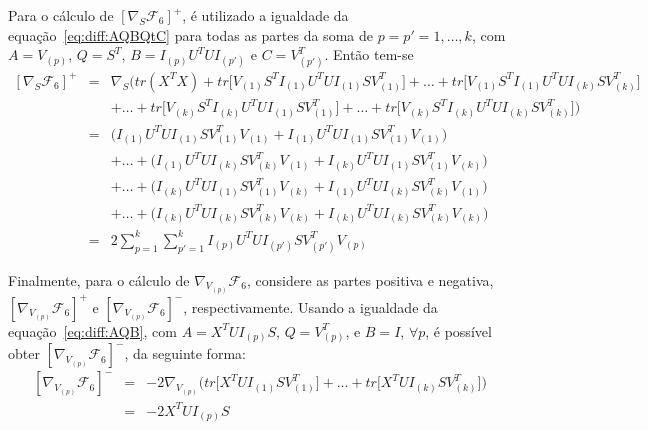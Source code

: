 \documentclass[
    12pt,                %
    oneside,            %
    a4paper,            %
    english,            %
    brazil                %
    ]{abntex2ppgsi}
\begin{document}
Para o cálculo de $[\nabla_S \mathcal{F}_6]^+$, é utilizado a igualdade da equação~\ref{eq:diff:AQBQtC} para todas as partes da soma de $p = p' = 1, \dots, k$, com $A = V_{(p)}$, $Q = S^T$, $B = I_{(p)} U^T U I_{(p')}$ e $C = V_{(p')}^T$. Então tem-se
\[
    \begin{array}{lcl}
        [\nabla_S \mathcal{F}_6]^+ & = & \nabla_S \Big( tr(X^TX) + tr\big[ V_{(1)} S^T I_{(1)} U^T U I_{(1)} S V_{(1)}^T \big] + \dots + tr\big[ V_{(1)} S^T I_{(1)} U^T U I_{(k)} S V_{(k)}^T \big]  \\
                                   &   & + \dots + tr\big[ V_{(k)} S^T I_{(k)} U^T U I_{(1)} S V_{(1)}^T \big] + \dots + tr\big[ V_{(k)} S^T I_{(k)} U^T U I_{(k)} S V_{(k)}^T \big] \Big) \\
                                   & = & \big( I_{(1)} U^T U I_{(1)} S V_{(1)}^T V_{(1)} + I_{(1)} U^T U I_{(1)} S V_{(1)}^T V_{(1)} \big) \\
                                   &   & + \dots + \big( I_{(1)} U^T U I_{(k)} S V_{(k)}^T V_{(1)} + I_{(k)} U^T U I_{(1)} S V_{(1)}^T V_{(k)} \big) \\
                                   &   & + \dots + \big( I_{(k)} U^T U I_{(1)} S V_{(1)}^T V_{(k)} + I_{(1)} U^T U I_{(k)} S V_{(k)}^T V_{(1)} \big) \\
                                   &   & + \dots + \big( I_{(k)} U^T U I_{(k)} S V_{(k)}^T V_{(k)} + I_{(k)} U^T U I_{(k)} S V_{(k)}^T V_{(k)} \big) \\
                                   & = & 2 \sum_{p=1}^{k} \sum_{p'=1}^{k} I_{(p)} U^T U I_{(p')} S V_{(p')}^T V_{(p)}
    \end{array}
\]


Finalmente, para o cálculo de $\nabla_{V_{(p)}} \mathcal{F}_6$, considere as partes positiva e negativa, $[\nabla_{V_{(p)}} \mathcal{F}_6]^+$ e $[\nabla_{V_{(p)}} \mathcal{F}_6]^-$, respectivamente. Usando a igualdade da equação~\ref{eq:diff:AQB}, com $A = X^T U I_{(p)} S$, $Q = V^{T}_{(p)}$, e $B = I$, $\forall p$, é possível obter $[\nabla_{V_{(p)}} \mathcal{F}_6]^-$, da seguinte forma:
\[
    \begin{array}{lcl}
        [\nabla_{V_{(p)}} \mathcal{F}_6]^- & = & - 2 \nabla_{V_{(p)}} \Big( tr\big[ X^T U I_{(1)}SV_{(1)}^T \big] + \dots + tr\big[ X^T U I_{(k)}SV_{(k)}^T \big] \Big) \\
                                           & = & - 2 X^T U I_{(p)} S
    \end{array}
\]
\end{document}
